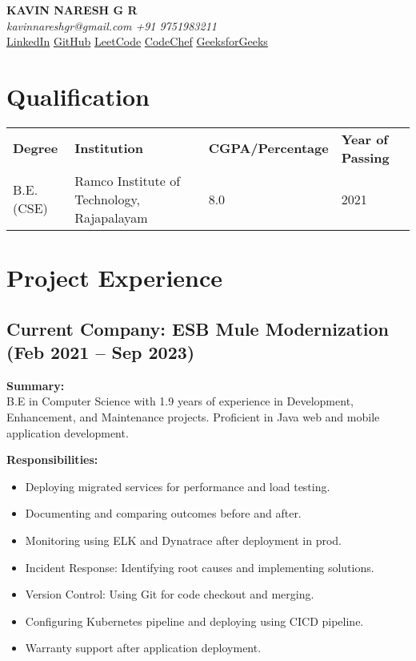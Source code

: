\documentclass[letterpaper,10pt]{article}
\begin{document}
\pagestyle{empty} %

\begin{center}
  \textbf{\LARGE KAVIN NARESH G R} \\
  \textit{kavinnareshgr@gmail.com \quad +91 9751983211} \\
  \href{https://www.linkedin.com/in/kavin-naresh-g-r/}{LinkedIn} \quad \href{https://github.com/kavin-naresh}{GitHub} \quad \href{https://leetcode.com/kavinnareshgr/}{LeetCode} \quad \href{https://www.codechef.com/users/kavinnaresh/}{CodeChef} \quad \href{https://auth.geeksforgeeks.org/user/kavinnan6sj}{GeeksforGeeks}
\end{center}

\section*{Qualification}
\begin{tabular}{l l l l}
\textbf{Degree} & \textbf{Institution} & \textbf{CGPA/Percentage} & \textbf{Year of Passing} \\
B.E.(CSE) & Ramco Institute of Technology, Rajapalayam & 8.0 & 2021 \\
\end{tabular}

\section*{Project Experience}

\subsection*{Current Company: ESB Mule Modernization (Feb 2021 -- Sep 2023)}
\textbf{Summary:} \\
B.E in Computer Science with 1.9 years of experience in Development, Enhancement, and Maintenance projects. Proficient in Java web and mobile application development.

\textbf{Responsibilities:}
\begin{itemize}[left=0pt, label={}]
    \item Deploying migrated services for performance and load testing.
    \item Documenting and comparing outcomes before and after.
    \item Monitoring using ELK and Dynatrace after deployment in prod.
    \item Incident Response: Identifying root causes and implementing solutions.
    \item Version Control: Using Git for code checkout and merging.
    \item Configuring Kubernetes pipeline and deploying using CICD pipeline.
    \item Warranty support after application deployment.
\end{itemize}
\end{document}
